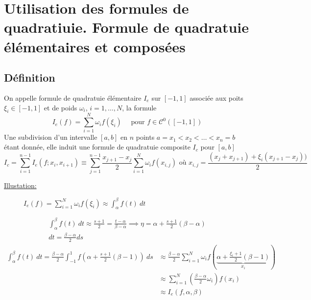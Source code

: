 \section{Utilisation des formules de quadratiuie. Formule de quadratuie élémentaires et composées}
\subsection{Définition}
On appelle formule de quadratuie élémentaire $I_e$ sur  $[-1, 1]$ associée aux poits  $\xi_i \in [-1, 1]$ et de poids $\omega_i$,  $i = 1, \ldots, N$, la formule
\[
    I_e(f) = \sum_{i=1}^{N} \omega_if(\xi_i) \quad \text{ pour } f \in \mathcal{C}^0([-1, 1])
\] 
Une subdivision d'un intervalle $[a, b]$ en  $n$ points  $a = x_1 < x_2 < \ldots < x_n = b$ étant donnée, elle induit une formule de quadratuie composite $I_c$ pour  $[a, b]$ 
\[
I_c = \sum_{i=1}^{n-1} I_e(f; x_i, x_{i+1}) \equiv \sum_{j=1}^{n-1} \frac{x_{j+1} - x_{j}}{2}\sum_{i=1}^{N} \omega_{i}f(x_{i,j}) \text{ où } x_{i, j} = \frac{(x_j + x_{j+1}) + \xi_{i}(x_{j+1} - x_j))}{2}
\] 

\underline{Illustation:}
\begin{figure}[H]
    \centering
    \caption{$I_e(f) = \sum_{i=1}^{N} \omega_if(\xi_i) \approx \int_{{\alpha}}^{{\beta}} {f(t)} \: d{t} {}$}
    \label{fig:illustration-de-l-integrale}
\end{figure}
\begin{align*}
    \int_{{\alpha}}^{{\beta}} {f(t)} \: d{t} \approx \frac{s+1}{2}=\frac{t-\alpha}{\beta - \alpha} \implies \eta = \alpha + \frac{s+1}{2}(\beta - \alpha)\\
    dt = \frac{\beta - \alpha}{2} ds
\end{align*}
\begin{align*}
    \int_{{\alpha}}^{{\beta}} {f(t)} \: d{t} = \frac{\beta - \alpha}{2} \int_{{-1}}^{{1}} {f(\alpha + \frac{s+1}{2}(\beta - 1))} \: d{s} &\approx \frac{\beta - \alpha}{2}\sum_{i=1}^{N} \omega_if(\underbrace{ \alpha + \frac{\xi_{i}+1}{2}(\beta - 1) }_{x_i})\\
                                                                                                                                         &\approx \sum_{i=1}^{N} \left( \frac{\beta - \alpha}{2}\omega_i \right) f(x_i)\\
                                                                                                                                         &\approx I_e(f, \alpha, \beta)
\end{align*}
